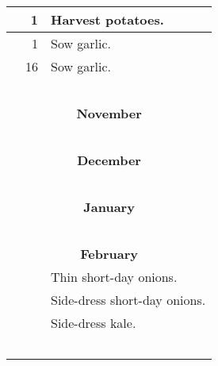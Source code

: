 \documentclass{article}
\begin{document}
\begin{longtable}{r|r|l}
	& 1 & Harvest potatoes. \\ \hline
	& 1 & Sow garlic. \\ \hline
	& 16 & Sow garlic. \\ \hline
	& & \\ \hline
	& & \\ \hline
	& & \\ \hline
	& & \\ \hline
	& & \\ \hline
	\multicolumn{3}{c}{\textbf{November}} \\ \hline
	& & \\ \hline
	& & \\ \hline
	& & \\ \hline
	& & \\ \hline
	& & \\ \hline
	\multicolumn{3}{c}{\textbf{December}} \\ \hline
	& & \\ \hline
	& & \\ \hline
	& & \\ \hline
	& & \\ \hline
	& & \\ \hline
	\multicolumn{3}{c}{\textbf{January}} \\ \hline
	& & \\ \hline
	& & \\ \hline
	& & \\ \hline
	& & \\ \hline
	& & \\ \hline
	\multicolumn{3}{c}{\textbf{February}} \\ \hline
	& & Thin short-day onions. \\ \hline
	& & Side-dress short-day onions. \\ \hline
	& & Side-dress kale. \\ \hline
	& & \\ \hline
	& & \\ \hline
	& & \\ \hline
	& & \\ \hline
	& & \\ \hline
\end{longtable}
\end{document}

